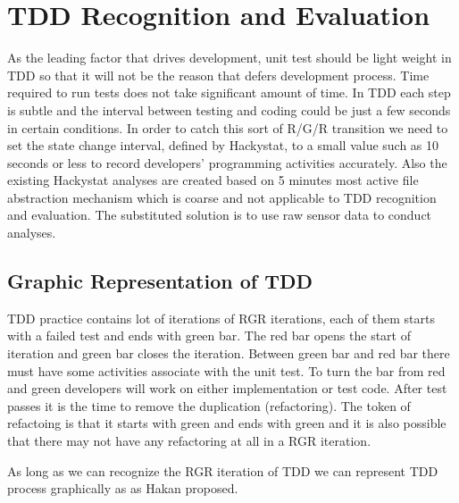 
\chapter{TDD Recognition and Evaluation}

As the leading factor that drives development, unit test should be light
weight in TDD so that it will not be the reason that defers development
process. Time required to run tests does not take significant amount of
time.  In TDD each step is subtle and the interval between testing and coding
could be just a few seconds in certain conditions. In order to catch this
sort of R/G/R transition we need to set the state change interval, defined
by Hackystat, to a small value such as 10 seconds or less to record
developers' programming activities accurately. Also the existing Hackystat
analyses are created based on 5 minutes most active file abstraction
mechanism which is coarse and not applicable to TDD recognition and
evaluation. The substituted solution is to use raw sensor data to conduct
analyses.

\section{Graphic Representation of TDD}
TDD practice contains lot of iterations of RGR iterations, each of them
starts with a failed test and ends with green bar. The red bar opens the
start of iteration and green bar closes the iteration. Between green bar
and red bar there must have some activities associate with the unit
test. To turn the bar from red and green developers will work on either
implementation or test code. After test passes it is the time to remove the
duplication (refactoring). The token of refactoing is that it starts with
green and ends with green and it is also possible that there may not have
any refactoring at all in a RGR iteration.

As long as we can recognize the RGR iteration of TDD we can represent TDD
process graphically as as Hakan proposed. 

